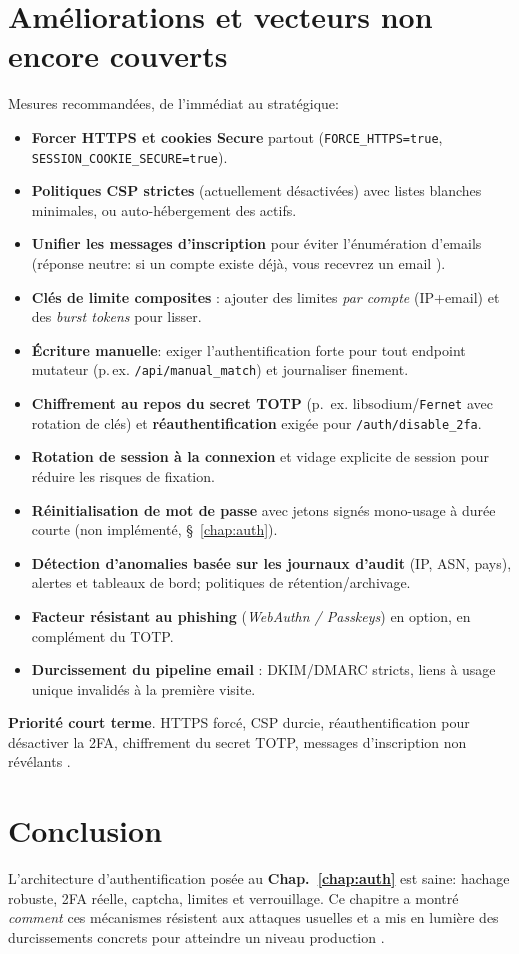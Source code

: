 \section{Améliorations et vecteurs non encore couverts}\label{sec:improve}
\noindent Mesures recommandées, de l'immédiat au stratégique:
\begin{itemize}
  \item \textbf{Forcer HTTPS et cookies Secure} partout (\texttt{FORCE\_HTTPS=true}, \texttt{SESSION\_COOKIE\_SECURE=true}).
  \item \textbf{Politiques CSP strictes} (actuellement désactivées) avec listes blanches minimales, ou auto-hébergement des actifs.
  \item \textbf{Unifier les messages d'inscription} pour éviter l'énumération d'emails (réponse neutre: \og si un compte existe déjà, vous recevrez un email \fg{}).
  \item \textbf{Clés de limite composites} : ajouter des limites \emph{par compte} (IP+email) et des \emph{burst tokens} pour lisser.
  \item \textbf{Écriture manuelle}: exiger l'authentification forte pour tout endpoint mutateur (p.\,ex. \texttt{/api/manual\_match}) et journaliser finement.
  \item \textbf{Chiffrement au repos du secret TOTP} (p.~ex. libsodium/\texttt{Fernet} avec rotation de clés) et \textbf{réauthentification} exigée pour \texttt{/auth/disable\_2fa}.
  \item \textbf{Rotation de session à la connexion} et vidage explicite de session pour réduire les risques de fixation.
  \item \textbf{Réinitialisation de mot de passe} avec jetons signés mono-usage à durée courte (non implémenté, \S~\ref{chap:auth}).
  \item \textbf{Détection d'anomalies basée sur les journaux d'audit} (IP, ASN, pays), alertes et tableaux de bord; politiques de rétention/archivage.
  \item \textbf{Facteur résistant au phishing} (\emph{WebAuthn / Passkeys}) en option, en complément du TOTP.
  \item \textbf{Durcissement du pipeline email} : DKIM/DMARC stricts, liens à usage unique invalidés à la première visite.
\end{itemize}

\vspace{0.5em}
\noindent \textbf{Priorité court terme}. HTTPS forcé, CSP durcie, réauthentification pour désactiver la 2FA, chiffrement du secret TOTP, messages d'inscription non \og révélants \fg{}.

\section{Conclusion}
\noindent L'architecture d'authentification posée au \textbf{Chap.~\ref{chap:auth}} est saine: hachage robuste, 2FA réelle, captcha, limites et verrouillage. Ce chapitre a montré \emph{comment} ces mécanismes résistent aux attaques usuelles et a mis en lumière des durcissements concrets pour atteindre un niveau \og production \fg{}.

